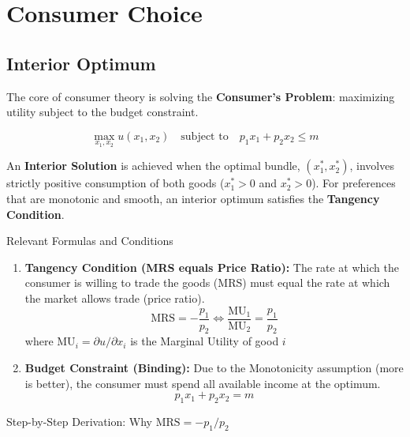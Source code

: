 \documentclass{article}
\begin{document}
\section{Consumer Choice}
\subsection{Interior Optimum}

The core of consumer theory is solving the \textbf{Consumer's Problem}: maximizing utility subject to the budget constraint.

\[\max_{x_1, x_2} u(x_1, x_2) \quad \text{subject to} \quad p_1 x_1 + p_2 x_2 \leq m\]

An \textbf{Interior Solution} is achieved when the optimal bundle, $(x_1^*, x_2^*)$, involves strictly positive consumption of both goods ($x_1^* > 0$ and $x_2^* > 0$). For preferences that are monotonic and smooth, an interior optimum satisfies the \textbf{Tangency Condition}.

\noindent Relevant Formulas and Conditions
\begin{enumerate}
    \item \textbf{Tangency Condition (MRS equals Price Ratio):} The rate at which the consumer is willing to trade the goods (MRS) must equal the rate at which the market allows trade (price ratio).
    \[\text{MRS} = -\frac{p_1}{p_2} \iff \frac{\text{MU}_1}{\text{MU}_2} = \frac{p_1}{p_2}\]
    where $\text{MU}_i = \partial u / \partial x_i$ is the Marginal Utility of good $i$

    \item \textbf{Budget Constraint (Binding):} Due to the Monotonicity assumption (more is better), the consumer must spend all available income at the optimum.
    \[p_1 x_1 + p_2 x_2 = m\]
\end{enumerate}

\noindent Step-by-Step Derivation: Why $\text{MRS} = -p_1/p_2$
\end{document}
